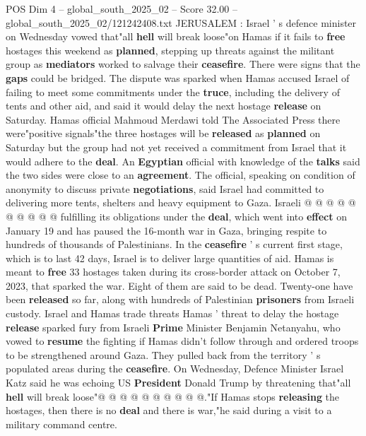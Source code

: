 \begin{textsample}{POS Dim 4 – global\_south\_2025\_02 – Score 32.00 – global\_south\_2025\_02/121242408.txt}  \label{ex:f4_pos_024}
JERUSALEM : Israel ' s defence minister on Wednesday vowed that"all \textbf{hell} will break loose"on Hamas if it fails to \textbf{free} hostages this weekend as \textbf{planned}, stepping up threats against the militant group as \textbf{mediators} worked to salvage their \textbf{ceasefire}.
There were signs that the \textbf{gaps} could be bridged.
The dispute was sparked when Hamas accused Israel of failing to meet some commitments under the \textbf{truce}, including the delivery of tents and other aid, and said it would delay the next hostage \textbf{release} on Saturday.
Hamas official Mahmoud Merdawi told The Associated Press there were"positive signals"the three hostages will be \textbf{released} as \textbf{planned} on Saturday but the group had not yet received a commitment from Israel that it would adhere to the \textbf{deal}.
An \textbf{Egyptian} official with knowledge of the \textbf{talks} said the two sides were close to an \textbf{agreement}.
The official, speaking on condition of anonymity to discuss private \textbf{negotiations}, said Israel had committed to delivering more tents, shelters and heavy equipment to Gaza.
Israeli @ @ @ @ @ @ @ @ @ @ fulfilling its obligations under the \textbf{deal}, which went into \textbf{effect} on January 19 and has paused the 16-month war in Gaza, bringing respite to hundreds of thousands of Palestinians.
In the \textbf{ceasefire} ' s current first stage, which is to last 42 days, Israel is to deliver large quantities of aid.
Hamas is meant to \textbf{free} 33 hostages taken during its cross-border attack on October 7, 2023, that sparked the war.
Eight of them are said to be dead.
Twenty-one have been \textbf{released} so far, along with hundreds of Palestinian \textbf{prisoners} from Israeli custody.
Israel and Hamas trade threats Hamas ' threat to delay the hostage \textbf{release} sparked fury from Israeli \textbf{Prime} Minister Benjamin Netanyahu, who vowed to \textbf{resume} the fighting if Hamas didn't follow through and ordered troops to be strengthened around Gaza.
They pulled back from the territory ' s populated areas during the \textbf{ceasefire}.
On Wednesday, Defence Minister Israel Katz said he was echoing US \textbf{President} Donald Trump by threatening that"all \textbf{hell} will break loose"@ @ @ @ @ @ @ @ @ @."If Hamas stops \textbf{releasing} the hostages, then there is no \textbf{deal} and there is war,"he said during a visit to a military command centre.

\end{textsample}
